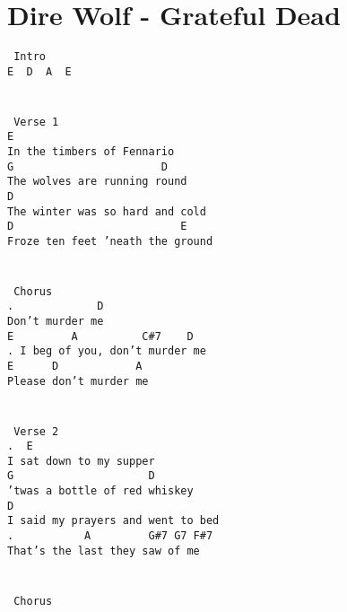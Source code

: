 \newpage
\section{Dire Wolf - Grateful Dead}
\label{Dire Wolf - Grateful Dead}
\texttt{\lbrack\ Intro\rbrack\\
E\ \ D\ \ A\ \ E\\
\\
\\
\lbrack\ Verse\ 1\rbrack\\
E\\
In\ the\ timbers\ of\ Fennario\\
G\ \ \ \ \ \ \ \ \ \ \ \ \ \ \ \ \ \ \ \ \ \ \ D\\
The\ wolves\ are\ running\ round\\
D\ \\
The\ winter\ was\ so\ hard\ and\ cold\\
D\ \ \ \ \ \ \ \ \ \ \ \ \ \ \ \ \ \ \ \ \ \ \ \ \ \ E\\
Froze\ ten\ feet\ 'neath\ the\ ground\\
\\
\\
\lbrack\ Chorus\rbrack\\
. \ \ \ \ \ \ \ \ \ \ \ \ D\\
Don't\ murder\ me\\
E\ \ \ \ \ \ \ \ \ A\ \ \ \ \ \ \ \ \ \ C\#7\ \ \ \ D\\
. I\ beg\ of\ you,\ don't\ murder\ me\\
E\ \ \ \ \ \ D\ \ \ \ \ \ \ \ \ \ \ \ A\\
Please\ don't\ murder\ me\\
\\
\\
\lbrack\ Verse\ 2\rbrack\\
. \ E\\
I\ sat\ down\ to\ my\ supper\\
G\ \ \ \ \ \ \ \ \ \ \ \ \ \ \ \ \ \ \ \ \ D\\
'twas\ a\ bottle\ of\ red\ whiskey\\
D\ \\
I\ said\ my\ prayers\ and\ went\ to\ bed\\
. \ \ \ \ \ \ \ \ \ \ A\ \ \ \ \ \ \ \ \ G\#7\ G7\ F\#7\\
That's\ the\ last\ they\ saw\ of\ me\\
\\
\\
\lbrack\ Chorus\rbrack\\
}
